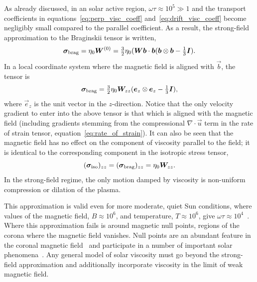 As already discussed, in an solar active region, $\omega \tau \approx 10^5 \gg 1$ and the transport coefficients in equations~\ref{eq:perp_visc_coeff} and~\ref{eq:drift_visc_coeff} become negligibly small compared to the parallel coefficient. As a result, the strong-field approximation to the Braginskii tensor is written,
\begin{equation}
  \label{eq:strong_field_approx}
{\bm \sigma}_{\text{brag}} = \eta_0 {\bm W}^{(0)} = \tfrac{3}{2} \eta_0 ({\bm W} {\bm b} \cdot {\bm b} ( {\bm b} \otimes {\bm b} - \tfrac{1}{3} {\bm I}).
\end{equation}
In a local coordinate system where the magnetic field is aligned with $\vec{b}$, the tensor is
\begin{equation}
  \label{eq:z_aligned_strong_field_approx}
{\bm \sigma}_{\text{brag}} = \tfrac{3}{2} \eta_0 {\bm W}_{zz} ( {\bm e}_z \otimes {\bm e}_z - \tfrac{1}{3} {\bm I}),
\end{equation}
where $\vec{e}_z$ is the unit vector in the $z$-direction. Notice that the only velocity gradient to enter into the above tensor is that which is aligned with the magnetic field (including gradients stemming from the compressional $\nabla \cdot \vec{u}$ term in the rate of strain tensor, equation~\ref{eq:rate_of_strain}). It can also be seen that the magnetic field has no effect on the component of viscosity parallel to the field; it is identical to the corresponding component in the isotropic stress tensor,
\begin{equation}
  \label{eq:z_aligned_iso}
  ({\bm \sigma}_{\text{iso}})_{zz} = ({\bm \sigma}_{\text{brag}})_{zz} = \eta_0 {\bm W}_{zz}.
\end{equation}
In the strong-field regime, the only motion damped by viscosity is non-uniform compression or dilation of the plasma. 

This approximation is valid even for more moderate, quiet Sun conditions, where values of the magnetic field, $B\approx 10^6$, and temperature, $T\approx 10^6$, give $\omega\tau \approx 10^4$~\cite{morganGlobalConditionsSolar2017}. Where this approximation fails is around magnetic null points, regions of the corona where the magnetic field vanishes. Null points are an abundant feature in the coronal magnetic field~\cite{edwardsNullPointDistribution2015} and participate in a number of important solar phenomena~\cite{massonNATUREFLARERIBBONS2009,moreno-insertisPLASMAJETSERUPTIONS2013,barnesRelationshipCoronalMagnetic2007}. Any general model of solar viscosity must go beyond the strong-field approximation and additionally incorporate viscosity in the limit of weak magnetic field.

